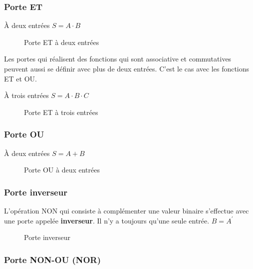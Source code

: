 \documentclass[11pt]{article}
\begin{document}
\subsubsection{Porte ET}
\label{sec:org427e0f6}

À deux entrées \(S =  A \cdot B\)

\begin{figure}[htbp]
\centering

\caption{\label{fig:org38866f5}Porte ET à deux entrées}
\end{figure}

Les portes qui réalisent des fonctions qui sont associative et
commutatives peuvent aussi se définir avec plus de deux entrées. C'est
le cas avec les fonctions ET et OU.

À trois entrées \(S =  A \cdot B \cdot C\)

\begin{figure}[htbp]
\centering

\caption{\label{fig:org71981ba}Porte ET à trois entrées}
\end{figure}

\subsubsection{Porte OU}
\label{sec:orge3db8e1}

À deux entrées \(S =  A + B\)

\begin{figure}[htbp]
\centering

\caption{\label{fig:org40427ba}Porte OU à deux entrées}
\end{figure}

\subsubsection{Porte inverseur}
\label{sec:org68a94f1}

L'opération NON qui consiste à complémenter une valeur binaire
s'effectue avec une porte appelée \textbf{inverseur}.  Il n'y a toujours
qu'une seule entrée. \(B = A^\prime\)

\begin{figure}[htbp]
\centering

\caption{\label{fig:org6c8cd14}Porte inverseur}
\end{figure} 

\subsubsection{Porte NON-OU (NOR)}
\label{sec:orga977b4e}
\end{document}
